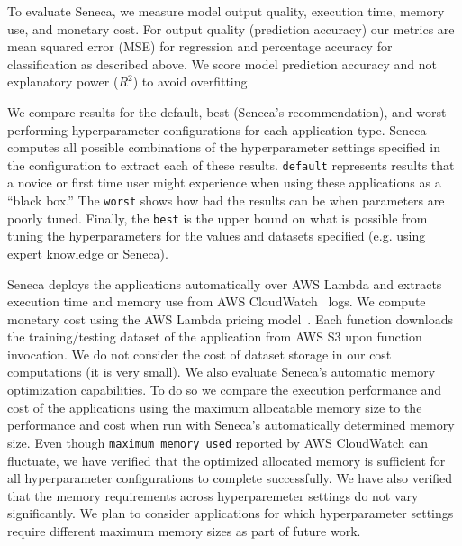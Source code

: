 To evaluate Seneca, we measure model output quality, execution time, memory use, and monetary cost.  For output quality (prediction accuracy) our metrics are mean squared error (MSE) for regression and percentage accuracy for classification as described above. We score model prediction accuracy and not explanatory power ($R^2$) to avoid overfitting. 


We compare results for the default, best (Seneca's recommendation), and worst performing hyperparameter configurations for each application type. Seneca computes all possible combinations of the hyperparameter settings specified in the configuration to extract each of these results.  \texttt{default} represents results that a novice or first time user might experience when using these applications as a ``black box.''  The \texttt{worst} shows how bad the results can be when parameters are poorly tuned.  Finally, the \texttt{best} is the upper bound on what is possible from tuning the hyperparameters for the values and datasets specified  (e.g. using expert knowledge or Seneca). 

Seneca deploys the applications automatically over AWS Lambda
and extracts execution time and memory use from 
AWS CloudWatch~\cite{ref:awscloudwatch} logs.
We compute monetary cost using the AWS Lambda pricing model~\cite{ref:pricing}.
Each function downloads the training/testing dataset 
of the application from AWS S3 upon function invocation. 
We do not consider the cost of dataset storage 
in our cost computations (it is very small).
We also evaluate Seneca's automatic memory optimization capabilities.  To
do so we compare the execution performance and cost of the applications using
the maximum allocatable memory size to the performance and cost when run with
Seneca's automatically determined memory size. Even though \texttt{maximum memory used} reported by AWS CloudWatch can fluctuate, we 
have verified that the optimized allocated memory is sufficient for all 
hyperparameter configurations to complete successfully.  We have also verified
that the memory requirements across hyperparemeter settings do not vary 
significantly. We plan to consider applications for which hyperparameter settings require
different maximum memory sizes as part of future work.


